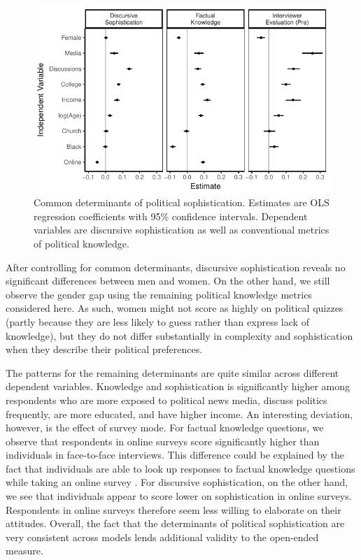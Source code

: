 \documentclass[12pt]{article}
\begin{document}
\begin{figure}[h]\centering
\includegraphics{../fig/determinants_pres.pdf}
\caption{Common determinants of political sophistication. Estimates are OLS regression coefficients with 95\% confidence intervals. Dependent variables are discursive sophistication as well as conventional metrics of political knowledge.
}\label{fig:determinants}
\end{figure}

After controlling for common determinants, discursive sophistication reveals no significant differences between men and women. On the other hand, we still observe the gender gap using the remaining political knowledge metrics considered here. As such, women might not score as highly on political quizzes (partly because they are less likely to guess rather than express lack of knowledge), but they do not differ substantially in complexity and sophistication when they describe their political preferences.

The patterns for the remaining determinants are quite similar across different dependent variables. Knowledge and sophistication is significantly higher among respondents who are more exposed to political news media, discuss politics frequently, are more educated, and have higher income. An interesting deviation, however, is the effect of survey mode. For factual knowledge questions, we observe that respondents in online surveys score significantly higher than individuals in face-to-face interviews. This difference could be explained by the fact that individuals are able to look up responses to factual knowledge questions while taking an online survey \citep[see also][]{clifford2016cheating}. For discursive sophistication, on the other hand, we see that individuals appear to score lower on sophistication in online surveys. Respondents in online surveys therefore seem less willing to elaborate on their attitudes. Overall, the fact that the determinants of political sophistication are very consistent across models lends additional validity to the open-ended measure.
\end{document}
